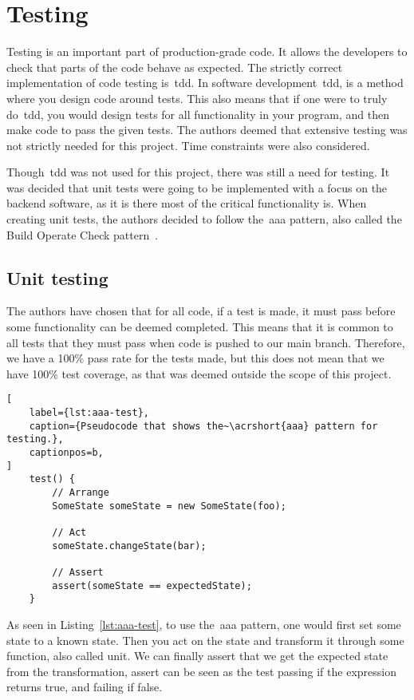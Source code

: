 \section{Testing}\label{sec:testing}

Testing is an important part of production-grade code.
It allows the developers to check that parts of the code behave as expected.
The strictly correct implementation of code testing is~\acrfull{tdd}.
In software development~\acrshort{tdd}, is a method where you design code around tests.
This also means that if one were to truly do~\acrshort{tdd}, you would design tests for all functionality
in your program, and then make code to pass the given tests.
The authors deemed that extensive testing was not strictly needed for this project.
Time constraints were also considered.

Though~\acrshort{tdd} was not used for this project, there was still a need for testing.
It was decided that unit tests were going to be implemented with a focus on the backend software, as
it is there most of the critical functionality is.
When creating unit tests, the authors decided to follow the~\acrfull{aaa} pattern, also called the Build Operate
Check pattern~\cite{clean-code}.

\subsection{Unit testing}\label{subsec:unit-tests}

The authors have chosen that for all code, if a test is made, it must pass before some functionality can be
deemed completed.
This means that it is common to all tests that they must pass when code is pushed to our main branch.
Therefore, we have a 100\% pass rate for the tests made, but this does not mean that we
have 100\% test coverage, as that was deemed outside the scope of this project.

\begin{lstlisting}[
    label={lst:aaa-test},
    caption={Pseudocode that shows the~\acrshort{aaa} pattern for testing.},
    captionpos=b,
]
    test() {
        // Arrange
        SomeState someState = new SomeState(foo);

        // Act
        someState.changeState(bar);

        // Assert
        assert(someState == expectedState);
    }
\end{lstlisting}

As seen in Listing~\ref{lst:aaa-test}, to use the~\acrshort{aaa} pattern,
one would first set some state to a known state.
Then you act on the state and transform it through some function, also called unit.
We can finally assert that we get the expected state from the transformation, assert can be seen
as the test passing if the expression returns true, and failing if false.


